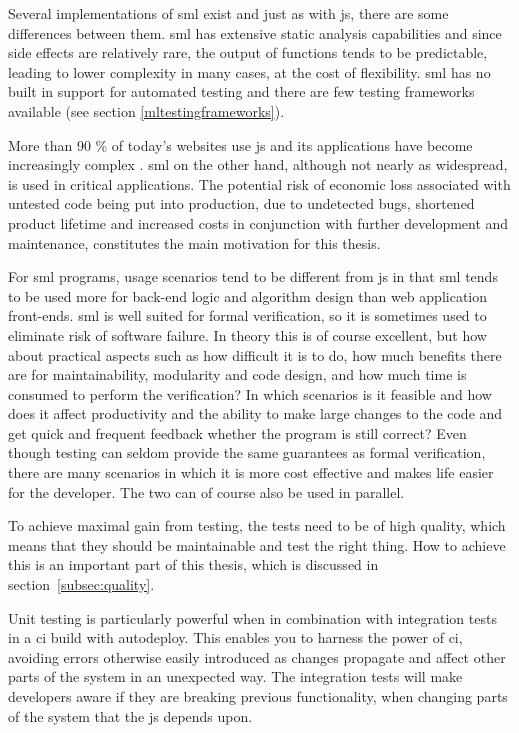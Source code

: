 \documentclass[11pt]{article}
\begin{document}
Several implementations of \gls{sml} exist and just as with \gls{js}, there are some differences between them. \gls{sml} has extensive static analysis capabilities and since side effects are relatively rare, the output of functions tends to be predictable, leading to lower complexity in many cases, at the cost of flexibility. \gls{sml} has no built in support for automated testing and there are few testing frameworks available (see section \ref{mltestingframeworks}).

More than 90 \% of today's websites use \gls{js} \cite{BusinessJavascript} and its applications have become increasingly complex \cite[question~23]{Ekelof}. \gls{sml} on the other hand, although not nearly as widespread, is used in critical applications. The potential risk of economic loss associated with untested code being put into production, due to undetected bugs, shortened product lifetime and increased costs in conjunction with further development and maintenance, constitutes the main motivation for this thesis.

For \gls{sml} programs, usage scenarios tend to be different from \gls{js} in that \gls{sml} tends to be used more for back-end logic and algorithm design than web application front-ends. \gls{sml} is well suited for formal verification, so it is sometimes used to eliminate risk of software failure. In theory this is of course excellent, but how about practical aspects such as how difficult it is to do, how much benefits there are for maintainability, modularity and code design, and how much time is consumed to perform the verification? In which scenarios is it feasible and how does it affect productivity and the ability to make large changes to the code and get quick and frequent feedback whether the program is still correct? Even though testing can seldom provide the same guarantees as formal verification, there are many scenarios in which it is more cost effective and makes life easier for the developer. The two can of course also be used in parallel.

To achieve maximal gain from testing, the tests need to be of high quality, which means that they should be maintainable and test the right thing. How to achieve this is an important part of this thesis, which is discussed in section~\ref{subsec:quality}.

Unit testing is particularly powerful when in combination with integration tests in a
\gls{ci} build with \gls{autodeploy}.
This enables you to harness the power of \gls{ci}, avoiding errors otherwise easily introduced as changes propagate and affect other parts of the system in an unexpected way. The integration tests will make developers aware if they are breaking previous functionality, when changing parts of the system that the \gls{js} depends upon.
\end{document}
